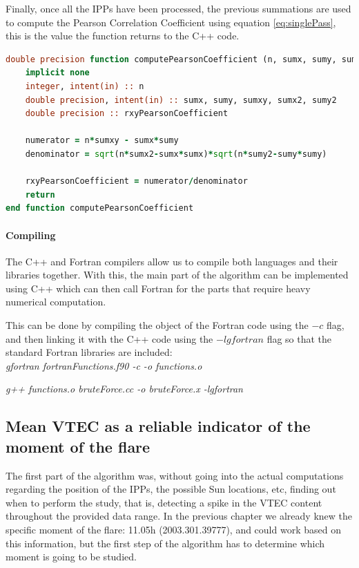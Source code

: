 Finally, once all the IPPs have been processed, the previous summations are used to compute the Pearson Correlation Coefficient using equation \ref{eq:singlePass}, this is the value the function returns to the C++ code.

\begin{minipage}{\linewidth}
\begin{lstlisting}[language=Fortran, caption=Computing the correlation coefficient using the summations]
double precision function computePearsonCoefficient (n, sumx, sumy, sumxy, sumx2, sumy2)
	implicit none
	integer, intent(in) :: n
	double precision, intent(in) :: sumx, sumy, sumxy, sumx2, sumy2 
	double precision :: rxyPearsonCoefficient

	numerator = n*sumxy - sumx*sumy
	denominator = sqrt(n*sumx2-sumx*sumx)*sqrt(n*sumy2-sumy*sumy)

	rxyPearsonCoefficient = numerator/denominator
	return
end function computePearsonCoefficient
\end{lstlisting}
\end{minipage}

\paragraph{Compiling}

The C++ and Fortran compilers allow us to compile both languages and their libraries together. With this, the main part of the algorithm can be implemented using C++ which can then call Fortran for the parts that require heavy numerical computation.

This can be done by compiling the object of the Fortran code using the $-c$ flag, and then linking it with the C++ code using the $-lgfortran$ flag so that the standard Fortran libraries are included: \\

\textit{gfortran fortranFunctions.f90 -c -o functions.o}
	
\textit{g++ functions.o bruteForce.cc -o bruteForce.x -lgfortran}

\subsection{Mean VTEC as a reliable indicator of the moment of the flare}

The first part of the algorithm was, without going into the actual computations regarding the position of the IPPs, the possible Sun locations, etc, finding out when to perform the study, that is, detecting a spike in the VTEC content throughout the provided data range. 
In the previous chapter we already knew the specific moment of the flare: 11.05h (2003.301.39777), and could work based on this information, but the first step of the algorithm has to determine which moment is going to be studied.

